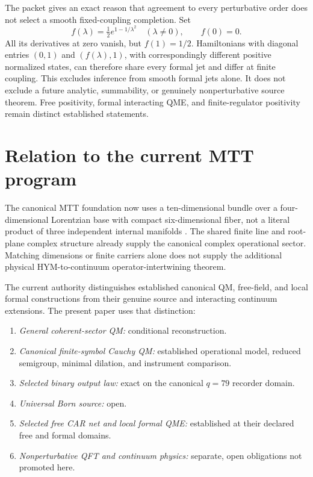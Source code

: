 \documentclass[11pt]{article}
\theoremstyle{definition}
\theoremstyle{remark}
\let\MTToriginalitem\item
\renewcommand{\item}{\par\MTToriginalitem}
\begin{document}
The packet gives an exact reason that agreement to every perturbative order
does not select a smooth fixed-coupling completion. Set
\[
f(\lambda)=\tfrac12 e^{1-1/\lambda^2}\quad(\lambda\ne0),\qquad f(0)=0.
\]
All its derivatives at zero vanish, but \(f(1)=1/2\). Hamiltonians with
diagonal entries \((0,1)\) and \((f(\lambda),1)\), with correspondingly
different positive normalized states, can therefore share every formal jet
and differ at finite coupling. This excludes inference from smooth formal
jets alone. It does not exclude a future analytic, summability, or genuinely
nonperturbative source theorem. Free positivity, formal interacting QME,
and finite-regulator positivity remain distinct established statements.

\section{Relation to the current MTT program}
\label{sec:mtt}

The canonical MTT foundation now uses a ten-dimensional bundle over a
four-dimensional Lorentzian base with compact six-dimensional fiber, not a
literal product of three independent internal manifolds
\cite{MTTFoundation2026}.  The shared finite line and root-plane complex
structure already supply the canonical complex operational sector. Matching
dimensions or finite carriers alone does not supply the additional physical
HYM-to-continuum operator-intertwining theorem.

The current authority distinguishes established canonical QM, free-field,
and local formal constructions from their genuine source and interacting
continuum extensions. The present paper uses that distinction:
\begin{enumerate}[leftmargin=2em]
\item \emph{General coherent-sector QM:} conditional reconstruction.
\item \emph{Canonical finite-symbol Cauchy QM:} established operational
      model, reduced semigroup, minimal dilation, and instrument comparison.
\item \emph{Selected binary output law:} exact on the canonical \(q=79\)
      recorder domain.
\item \emph{Universal Born source:} open.
\item \emph{Selected free CAR net and local formal QME:} established at
      their declared free and formal domains.
\item \emph{Nonperturbative QFT and continuum physics:} separate, open
      obligations not promoted here.
\end{enumerate}
\end{document}
